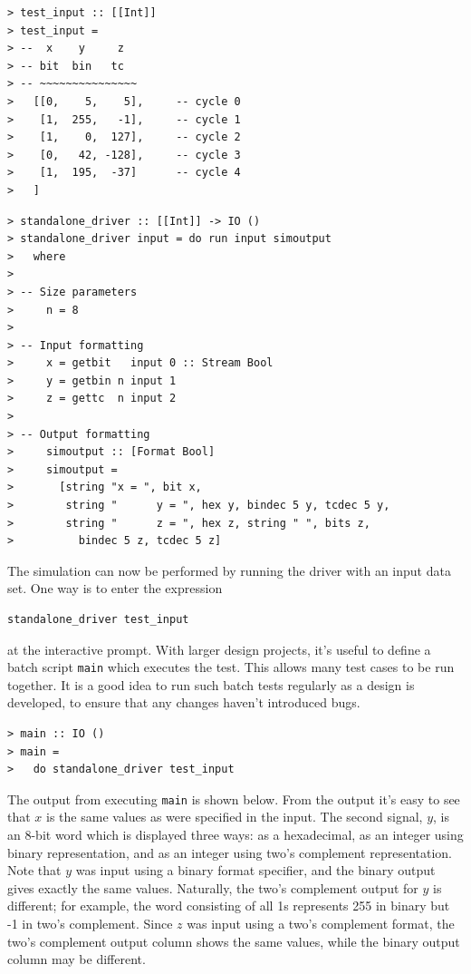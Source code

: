 \documentclass[a4paper,openany,fleqn]{book}
\begin{document}
\begin{verbatim}
> test_input :: [[Int]]
> test_input =
> --  x    y     z
> -- bit  bin   tc
> -- ~~~~~~~~~~~~~~~
>   [[0,    5,    5],     -- cycle 0
>    [1,  255,   -1],     -- cycle 1
>    [1,    0,  127],     -- cycle 2
>    [0,   42, -128],     -- cycle 3
>    [1,  195,  -37]      -- cycle 4
>   ]
\end{verbatim}

\begin{verbatim}
> standalone_driver :: [[Int]] -> IO ()
> standalone_driver input = do run input simoutput
>   where
>
> -- Size parameters
>     n = 8
>
> -- Input formatting
>     x = getbit   input 0 :: Stream Bool
>     y = getbin n input 1
>     z = gettc  n input 2
>
> -- Output formatting
>     simoutput :: [Format Bool]
>     simoutput =
>       [string "x = ", bit x,
>        string "      y = ", hex y, bindec 5 y, tcdec 5 y,
>        string "      z = ", hex z, string " ", bits z,
>          bindec 5 z, tcdec 5 z]
\end{verbatim}

The simulation can now be performed by running the driver with an
input data set.  One way is to enter the expression
\begin{verbatim}
standalone_driver test_input
\end{verbatim}
at the interactive prompt.  With larger design projects, it's useful
to define a batch script \texttt{main} which executes the test.  This
allows many test cases to be run together.  It is a good idea to run
such batch tests regularly as a design is developed, to ensure that
any changes haven't introduced bugs.
\begin{verbatim}
> main :: IO ()
> main =
>   do standalone_driver test_input
\end{verbatim}

The output from executing \texttt{main} is shown below.  From the
output it's easy to see that $x$ is the same values as were specified
in the input.  The second signal, $y$, is an 8-bit word which is
displayed three ways: as a hexadecimal, as an integer using binary
representation, and as an integer using two's complement
representation.  Note that $y$ was input using a binary format
specifier, and the binary output gives exactly the same values.
Naturally, the two's complement output for $y$ is different; for
example, the word consisting of all 1s represents 255 in binary but -1
in two's complement.  Since $z$ was input using a two's complement
format, the two's complement output column shows the same values,
while the binary output column may be different.
\end{document}
